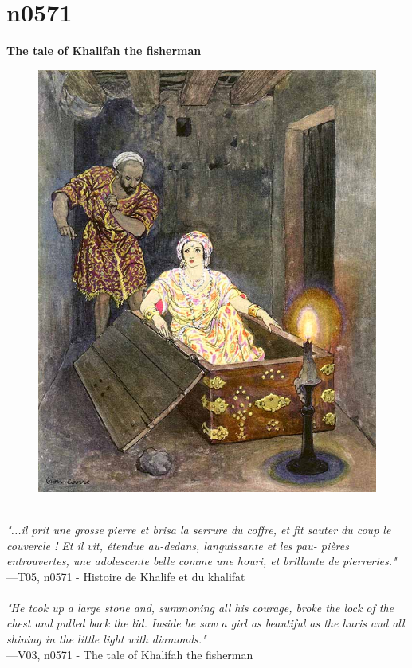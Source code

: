 \documentclass[../Carre_nights.tex]{subfiles}
\begin{document}
\newpage

\section{n0571}
\textbf{\Large{The tale of Khalifah the fisherman}} \\

\begin{figure}[ht]
\centering
\includegraphics[height=\figsize]{illustrations/volume_5/T05, n0571 - Histoire de Khalife et du khalifat.jpg}
\end{figure}

\textit{\\
"...il prit une grosse pierre et brisa la serrure du coffre, et fit sauter du coup le couvercle ! Et il vit, étendue au-dedans, languissante et les pau- pières entrouvertes, une adolescente belle comme une houri, et brillante de pierreries."} \\
—T05, n0571 - Histoire de Khalife et du khalifat \\~\\
\textit{"He took up a large stone and, summoning all his courage, broke the lock of the chest and pulled back the lid. Inside he saw a girl as beautiful as the huris and all shining in the little light with diamonds."} \\
—V03, n0571 - The tale of Khalifah the fisherman
\end{document}
